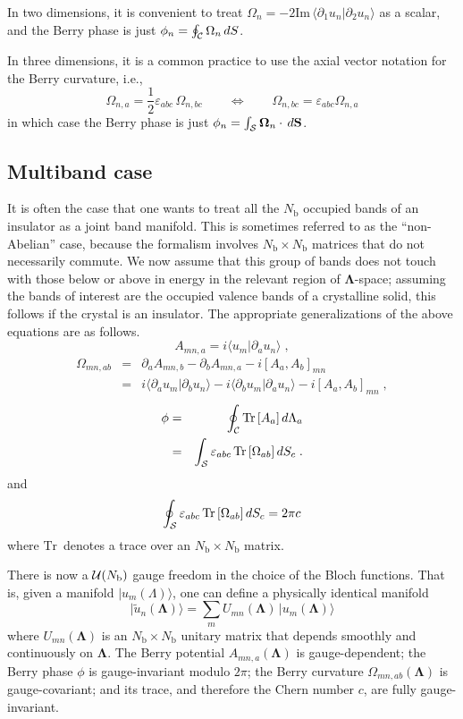 \documentclass[11pt]{article}
\numberwithin{equation}{section} %
\def\nn{\nonumber\\}
\def\bea{\begin{eqnarray}}
\def\eea{\end{eqnarray}}
\def\beq{\begin{equation}}
\def\eeq{\end{equation}}
\renewcommand{\Im}{\textrm{Im}}
\def\ket#1{\vert #1 \rangle}
\def\ip#1#2{\langle #1 \vert #2 \rangle}
\def\O{{\Omega}}
\def\bO{\mathbf{\Omega}}
\def\pa{\partial_a}
\def\pb{\partial_b}
\def\L{\Lambda}
\def\bL{\mathbf{\Lambda}}
\def\Im{\textrm{Im}\,}
\def\Tr{\textrm{Tr}\,}
\def\cC{{\cal C}}
\def\cS{{\cal S}}
\def\ve{\varepsilon}
\def\Nb{N_\textrm{b}}
\def\half{\frac{\textstyle{1}}{\textstyle{2}}}
\begin{document}
In two dimensions, it is convenient to treat $\O_n=-2\Im
\ip{\partial_1 u_n}{\partial_2 u_n}$ as a scalar, and the Berry
phase is just $\phi_n=\oint_\cC \O_n\,dS$.

In three dimensions, it is a common practice to use the axial vector
notation for the Berry curvature, i.e.,
%
\beq
\O_{n,a}= \half  \ve_{abc}\,\O_{n,bc} \qquad\Leftrightarrow\qquad
\O_{n,bc} = \ve_{abc} \O_{n,a}
\eeq
%
in which case the Berry phase is just
$\phi_n=\int_\cS \bO_n\cdot\,d\mathbf{S}$.

\subsection{Multiband case}

It is often the case that one wants to treat all the $\Nb$ occupied
bands of an insulator as a joint band manifold.  This is sometimes
referred to as the ``non-Abelian'' case, because the formalism
involves $\Nb\times\Nb$ matrices that do not necessarily commute.
We now assume that this group of bands does not touch with those
below or above in energy in the relevant region of $\bL$-space;
assuming the bands of interest are the occupied valence bands of
a crystalline solid, this follows if the crystal is an insulator.
The appropriate generalizations of the above equations are
as follows.
%
\beq
A_{mn,a}=i\ip{u_m}{\pa u_n} \;,
\eeq
%
\bea
\O_{mn,ab} &=& \pa A_{mn,b} - \pb A_{mn,a} -i[A_a,A_b]_{mn} \nn
   &=&  i\ip{\pa u_m}{\pb u_n}-i\ip{\pb u_m}{\pa u_n} -i[A_a,A_b]_{mn}\;,
\eea
%
\bea
\phi
&=&\oint_\cC \Tr[A_a]\,d\L_a \label{eq:bp}\\
&=& \int_\cS \ve_{abc}\,\Tr[\O_{ab}]\,dS_c \;.
\eea
%
and
%
\beq
\oint_\cS \ve_{abc}\,\Tr[\O_{ab}]\,dS_c=2\pi c
\eeq
%
where $\Tr$ denotes a trace over an $\Nb\times\Nb$ matrix.

There is now a ${\cal U}(\Nb)$ gauge freedom in the choice of the
Bloch functions.  That is, given a manifold
$\ket{u_m(\L)}$, one can define a physically identical manifold
%
\beq
\ket{\tilde{u}_n(\bL)}=\sum_m U_{mn}(\bL)\,\ket{u_m(\bL)}
\eeq
%
where $U_{mn}(\bL)$ is an $\Nb\times\Nb$ unitary matrix that
depends smoothly and continuously on $\bL$.
The Berry potential $A_{mn,a}(\bL)$ is gauge-dependent;
the Berry phase $\phi$ is gauge-invariant modulo $2\pi$;
the Berry curvature $\O_{mn,ab}(\bL)$ is gauge-covariant;
and its trace, and therefore the Chern number $c$, are fully
gauge-invariant.
\end{document}
